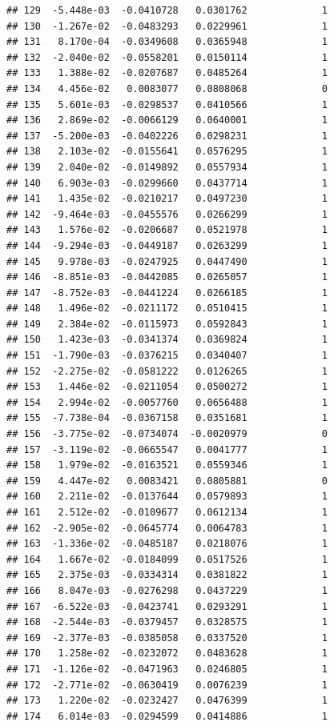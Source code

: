 \documentclass[12pt]{article}\usepackage[]{graphicx}\usepackage[]{xcolor}
\makeatletter
\newenvironment{kframe}{%
 \def\at@end@of@kframe{}%
 \ifinner\ifhmode%
  \def\at@end@of@kframe{\end{minipage}}%
  \begin{minipage}{\columnwidth}%
 \fi\fi%
 \def\FrameCommand##1{\hskip\@totalleftmargin \hskip-\fboxsep
 \colorbox{shadecolor}{##1}\hskip-\fboxsep
     \hskip-\linewidth \hskip-\@totalleftmargin \hskip\columnwidth}%
 \MakeFramed {\advance\hsize-\width
   \@totalleftmargin\z@ \linewidth\hsize
   \@setminipage}}%
 {\par\unskip\endMakeFramed%
 \at@end@of@kframe}
\newenvironment{knitrout}{}{} %
\makeatother
\begin{document}
\begin{knitrout}
\begin{kframe}
\begin{verbatim}
## 129  -5.448e-03  -0.0410728   0.0301762             1
## 130  -1.267e-02  -0.0483293   0.0229961             1
## 131   8.170e-04  -0.0349608   0.0365948             1
## 132  -2.040e-02  -0.0558201   0.0150114             1
## 133   1.388e-02  -0.0207687   0.0485264             1
## 134   4.456e-02   0.0083077   0.0808068             0
## 135   5.601e-03  -0.0298537   0.0410566             1
## 136   2.869e-02  -0.0066129   0.0640001             1
## 137  -5.200e-03  -0.0402226   0.0298231             1
## 138   2.103e-02  -0.0155641   0.0576295             1
## 139   2.040e-02  -0.0149892   0.0557934             1
## 140   6.903e-03  -0.0299660   0.0437714             1
## 141   1.435e-02  -0.0210217   0.0497230             1
## 142  -9.464e-03  -0.0455576   0.0266299             1
## 143   1.576e-02  -0.0206687   0.0521978             1
## 144  -9.294e-03  -0.0449187   0.0263299             1
## 145   9.978e-03  -0.0247925   0.0447490             1
## 146  -8.851e-03  -0.0442085   0.0265057             1
## 147  -8.752e-03  -0.0441224   0.0266185             1
## 148   1.496e-02  -0.0211172   0.0510415             1
## 149   2.384e-02  -0.0115973   0.0592843             1
## 150   1.423e-03  -0.0341374   0.0369824             1
## 151  -1.790e-03  -0.0376215   0.0340407             1
## 152  -2.275e-02  -0.0581222   0.0126265             1
## 153   1.446e-02  -0.0211054   0.0500272             1
## 154   2.994e-02  -0.0057760   0.0656488             1
## 155  -7.738e-04  -0.0367158   0.0351681             1
## 156  -3.775e-02  -0.0734074  -0.0020979             0
## 157  -3.119e-02  -0.0665547   0.0041777             1
## 158   1.979e-02  -0.0163521   0.0559346             1
## 159   4.447e-02   0.0083421   0.0805881             0
## 160   2.211e-02  -0.0137644   0.0579893             1
## 161   2.512e-02  -0.0109677   0.0612134             1
## 162  -2.905e-02  -0.0645774   0.0064783             1
## 163  -1.336e-02  -0.0485187   0.0218076             1
## 164   1.667e-02  -0.0184099   0.0517526             1
## 165   2.375e-03  -0.0334314   0.0381822             1
## 166   8.047e-03  -0.0276298   0.0437229             1
## 167  -6.522e-03  -0.0423741   0.0293291             1
## 168  -2.544e-03  -0.0379457   0.0328575             1
## 169  -2.377e-03  -0.0385058   0.0337520             1
## 170   1.258e-02  -0.0232072   0.0483628             1
## 171  -1.126e-02  -0.0471963   0.0246805             1
## 172  -2.771e-02  -0.0630419   0.0076239             1
## 173   1.220e-02  -0.0232427   0.0476399             1
## 174   6.014e-03  -0.0294599   0.0414886             1

\end{verbatim}
\end{kframe}
\end{knitrout}
\end{document}
